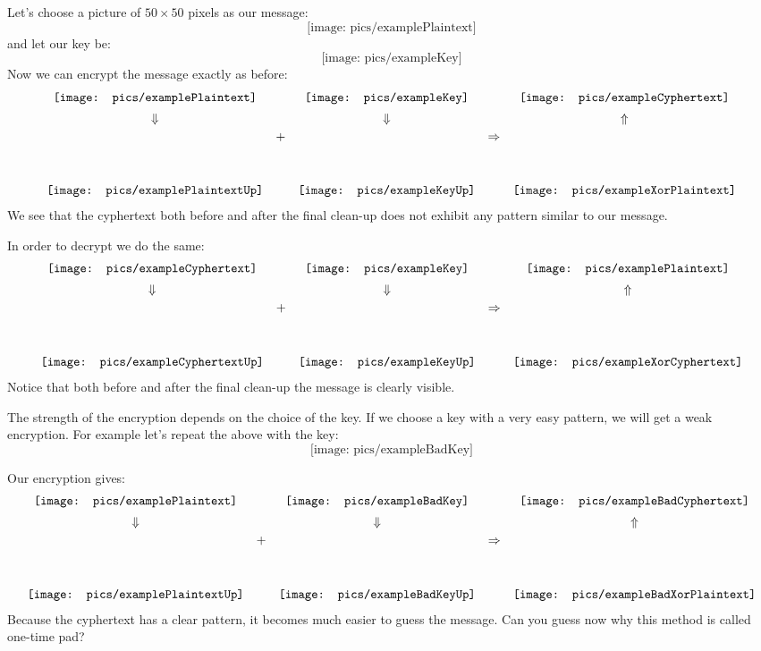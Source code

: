 \documentclass[a4paper,10pt]{article}
\newcommand{\exampleCyphertext}{\mathord{\texttt{[image: pics/exampleCyphertext]}}}
\newcommand{\exampleCyphertextUp}{\mathord{\texttt{[image: pics/exampleCyphertextUp]}}}
\newcommand{\exampleKey}{\mathord{\texttt{[image: pics/exampleKey]}}}
\newcommand{\exampleKeyUp}{\mathord{\texttt{[image: pics/exampleKeyUp]}}}
\newcommand{\examplePlaintext}{\mathord{\texttt{[image: pics/examplePlaintext]}}}
\newcommand{\examplePlaintextUp}{\mathord{\texttt{[image: pics/examplePlaintextUp]}}}
\newcommand{\exampleXorCyphertext}{\mathord{\texttt{[image: pics/exampleXorCyphertext]}}}
\newcommand{\exampleXorPlaintext}{\mathord{\texttt{[image: pics/exampleXorPlaintext]}}}
\newcommand{\exampleBadCyphertext}{\mathord{\texttt{[image: pics/exampleBadCyphertext]}}}
\newcommand{\exampleBadKey}{\mathord{\texttt{[image: pics/exampleBadKey]}}}
\newcommand{\exampleBadKeyUp}{\mathord{\texttt{[image: pics/exampleBadKeyUp]}}}
\newcommand{\exampleBadXorCyphertext}{\mathord{\texttt{[image: pics/exampleBadXorPlaintext]}}}
\begin{document}
Let's choose a picture of $50\times50$ pixels as our message:
\begin{equation*}
\examplePlaintext
\end{equation*}
and let our key be:
\begin{equation*}
\exampleKey
\end{equation*}
Now we can encrypt the message exactly as before:
\begin{equation*}
\begin{array}{ccccc}
\examplePlaintext &  & \exampleKey & & \exampleCyphertext \vspace{0.5em}\\
\Downarrow &  & \Downarrow& & \Uparrow \vspace{0.5em}\\
\examplePlaintextUp & \raisebox{10ex}{+} & \exampleKeyUp & \raisebox{10ex}{$\Rightarrow$} & \exampleXorPlaintext
\end{array}
\end{equation*}
We see that the cyphertext both before and after the final clean-up does not exhibit any pattern similar to our message.

In order to decrypt we do the same:
\begin{equation*}
\begin{array}{ccccc}
\exampleCyphertext & & \exampleKey & & \examplePlaintext \vspace{0.5em}\\
\Downarrow &  & \Downarrow& & \Uparrow \vspace{0.5em}\\
\exampleCyphertextUp & \raisebox{10ex}{+} & \exampleKeyUp & \raisebox{10ex}{$\Rightarrow$} & \exampleXorCyphertext
\end{array}
\end{equation*}
Notice that both before and after the final clean-up the message is clearly visible.

The strength of the encryption depends on the choice of the key. If we choose a key with a very easy pattern, we will get a weak encryption. For example let's repeat the above with the key:
\begin{equation*}
\exampleBadKey
\end{equation*}

Our encryption gives:
\begin{equation*}
\begin{array}{ccccc}
\examplePlaintext &  & \exampleBadKey & & \exampleBadCyphertext \vspace{0.5em}\\
\Downarrow &  & \Downarrow& & \Uparrow \vspace{0.5em}\\
\examplePlaintextUp & \raisebox{10ex}{+} & \exampleBadKeyUp & \raisebox{10ex}{$\Rightarrow$} & \exampleBadXorCyphertext
\end{array}
\end{equation*}
Because the cyphertext has a clear pattern, it becomes much easier to guess the message. Can you guess now why this method is called one-time pad?
\end{document}
